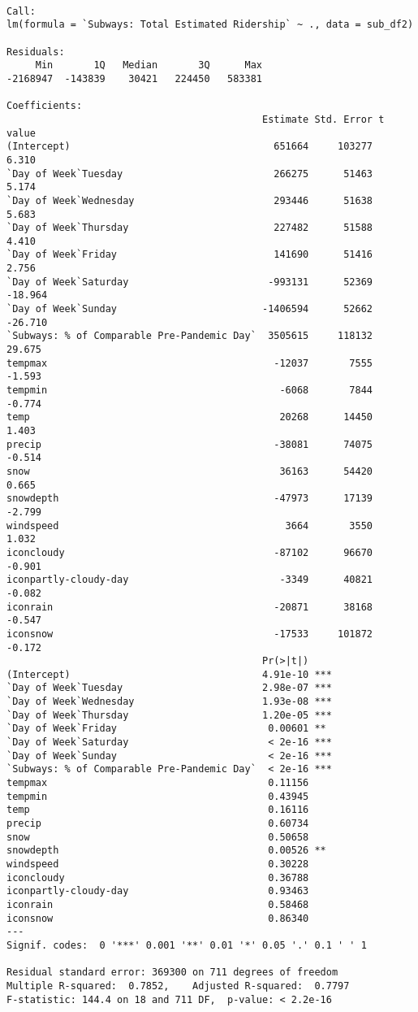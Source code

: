 \documentclass[
  letterpaper,
  DIV=11,
  numbers=noendperiod]{scrartcl}
\begin{document}
\begin{verbatim}

Call:
lm(formula = `Subways: Total Estimated Ridership` ~ ., data = sub_df2)

Residuals:
     Min       1Q   Median       3Q      Max 
-2168947  -143839    30421   224450   583381 

Coefficients:
                                            Estimate Std. Error t value
(Intercept)                                   651664     103277   6.310
`Day of Week`Tuesday                          266275      51463   5.174
`Day of Week`Wednesday                        293446      51638   5.683
`Day of Week`Thursday                         227482      51588   4.410
`Day of Week`Friday                           141690      51416   2.756
`Day of Week`Saturday                        -993131      52369 -18.964
`Day of Week`Sunday                         -1406594      52662 -26.710
`Subways: % of Comparable Pre-Pandemic Day`  3505615     118132  29.675
tempmax                                       -12037       7555  -1.593
tempmin                                        -6068       7844  -0.774
temp                                           20268      14450   1.403
precip                                        -38081      74075  -0.514
snow                                           36163      54420   0.665
snowdepth                                     -47973      17139  -2.799
windspeed                                       3664       3550   1.032
iconcloudy                                    -87102      96670  -0.901
iconpartly-cloudy-day                          -3349      40821  -0.082
iconrain                                      -20871      38168  -0.547
iconsnow                                      -17533     101872  -0.172
                                            Pr(>|t|)    
(Intercept)                                 4.91e-10 ***
`Day of Week`Tuesday                        2.98e-07 ***
`Day of Week`Wednesday                      1.93e-08 ***
`Day of Week`Thursday                       1.20e-05 ***
`Day of Week`Friday                          0.00601 ** 
`Day of Week`Saturday                        < 2e-16 ***
`Day of Week`Sunday                          < 2e-16 ***
`Subways: % of Comparable Pre-Pandemic Day`  < 2e-16 ***
tempmax                                      0.11156    
tempmin                                      0.43945    
temp                                         0.16116    
precip                                       0.60734    
snow                                         0.50658    
snowdepth                                    0.00526 ** 
windspeed                                    0.30228    
iconcloudy                                   0.36788    
iconpartly-cloudy-day                        0.93463    
iconrain                                     0.58468    
iconsnow                                     0.86340    
---
Signif. codes:  0 '***' 0.001 '**' 0.01 '*' 0.05 '.' 0.1 ' ' 1

Residual standard error: 369300 on 711 degrees of freedom
Multiple R-squared:  0.7852,    Adjusted R-squared:  0.7797 
F-statistic: 144.4 on 18 and 711 DF,  p-value: < 2.2e-16
\end{verbatim}
\end{document}
